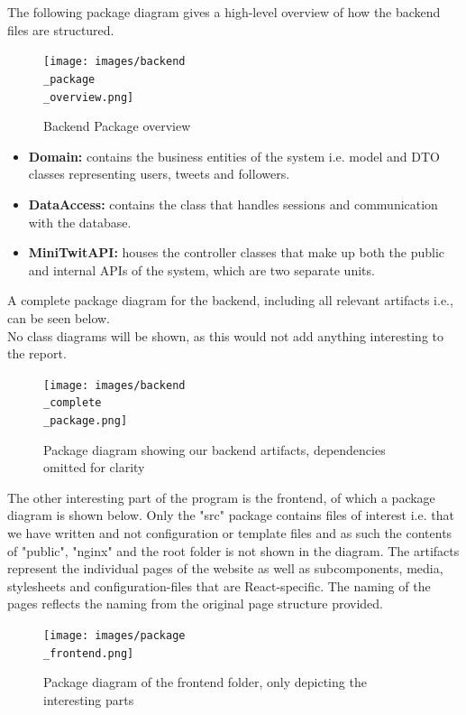 The following package diagram gives a high-level overview of how the backend files are structured.
\begin{figure}[H]
 \centering
 \texttt{[image: images/backend\\\_package\\\_overview.png]}
 \caption{Backend Package overview}
 \label{fig:BackendPackageDiagram}
\end{figure}
\begin{itemize}
    \item \textbf{Domain:} contains the business entities of the system i.e. model and DTO classes representing users, tweets and followers.
    \item \textbf{DataAccess:} contains the class that handles sessions and communication with the database.
    \item \textbf{MiniTwitAPI:} houses the controller classes that make up both the public and internal APIs of the system, which are two separate units. 
\end{itemize}
A complete package diagram for the backend, including all relevant artifacts i.e., can be seen below. \\
No class diagrams will be shown, as this would not add anything interesting to the report. \\
\begin{figure}[H]
 \centering
 \texttt{[image: images/backend\\\_complete\\\_package.png]}
 \caption{Package diagram showing our backend artifacts, dependencies omitted for clarity}
 \label{fig:BackendCompletePackageDiagram}
\end{figure}

\newpage
The other interesting part of the program is the frontend, of which a package diagram is shown below.
Only the "src" package contains files of interest i.e. that we have written and not configuration or template files and as such the contents of "public", "nginx" and the root folder is not shown in the diagram. The artifacts represent the individual pages of the website as well as subcomponents, media, stylesheets and configuration-files that are React-specific. The naming of the pages reflects the naming from the original page structure provided.

\begin{figure}[H]
 \centering
 \texttt{[image: images/package\\\_frontend.png]}
 \caption{Package diagram of the frontend folder, only depicting the interesting parts}
 \label{fig:FrontendPackageDiagram}
\end{figure}


